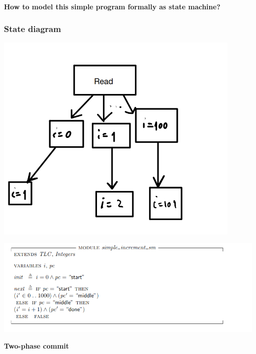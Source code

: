 \documentclass{beamer}
\begin{document}
\begin{frame}
    \begin{center}
        \LARGE{\textbf{How to model this simple program formally as state machine?}}
    \end{center}

\end{frame}

\begin{frame}
    \frametitle{State diagram}
    \includegraphics[width=0.9\textwidth, height=0.9\textheight]{img/1.png}
\end{frame}



\begin{frame}[fragile]
    \includegraphics[width=\textwidth]{./sm_increment.png}
\end{frame}

\begin{frame}
    \begin{center}
        \LARGE{\textbf{Two-phase commit}}
    \end{center}
\end{frame}
\end{document}
